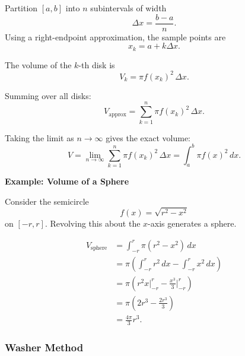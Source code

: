 \medskip

Partition $[a,b]$ into $n$ subintervals of width
\[
\Delta x = \frac{b-a}{n}.
\]
Using a right-endpoint approximation, the sample points are
\[
x_k = a + k\Delta x.
\]

The volume of the $k$-th disk is
\[
V_k = \pi f(x_k)^2 \,\Delta x.
\]

Summing over all disks:
\[
V_{\text{approx}} = \sum_{k=1}^{n} \pi f(x_k)^2 \,\Delta x.
\]

Taking the limit as $n \to \infty$ gives the exact volume:
\[
V = \lim_{n\to\infty} \sum_{k=1}^{n} \pi f(x_k)^2 \,\Delta x 
= \int_a^b \pi f(x)^2 \, dx.
\]

\medskip

\textbf{Example: Volume of a Sphere}

Consider the semicircle
\[
f(x) = \sqrt{r^2 - x^2}
\]
on $[-r,r]$. Revolving this about the $x$-axis generates a sphere.

\begin{align}
V_{\text{sphere}} 
&= \int_{-r}^{r} \pi (r^2 - x^2)\,dx \\
&= \pi\left(\int_{-r}^{r} r^2\,dx - \int_{-r}^{r} x^2\,dx\right) \\
&= \pi\left(r^2 x \Big|_{-r}^{r} - \frac{x^3}{3} \Big|_{-r}^{r}\right) \\
&= \pi\left(2r^3 - \frac{2r^3}{3}\right) \\
&= \frac{4\pi}{3} r^3.
\end{align}

\subsubsection{Washer Method}
\label{sss:wash-235c}

